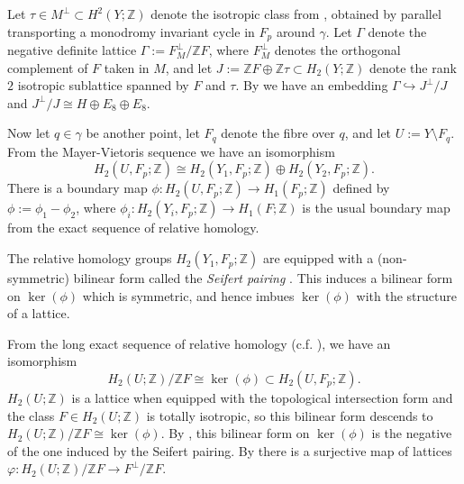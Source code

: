 \documentclass[a4paper]{amsart}
\theoremstyle{definition}
\theoremstyle{plain}
\theoremstyle{remark}
\newcommand{\bZ}{\mathbb{Z}}
\numberwithin{figure}{section}
\numberwithin{table}{section}
\begin{document}
Let $\tau \in M^{\perp} \subset H^2(Y;\bZ)$ denote the isotropic class from \cite[Definition 4.21]{dfk3slpms}, obtained by parallel transporting a monodromy invariant cycle in $F_p$ around $\gamma$. Let $\Gamma$ denote the negative definite lattice $\Gamma := F^{\perp}_{M}/\bZ F$, where $F^{\perp}_{M}$ denotes the orthogonal complement of $F$ taken in $M$, and let $J := \bZ F \oplus \bZ \tau \subset H_2(Y;\bZ)$ denote the rank $2$ isotropic sublattice spanned by $F$ and $\tau$. By \cite[Lemma 4.23]{dfk3slpms} we have an embedding $\Gamma \hookrightarrow J^{\perp}/J$ and $J^{\perp}/J \cong H \oplus E_8 \oplus E_8$.

Now let $q \in \gamma$ be another point, let $F_q$ denote the fibre over $q$, and let $U := Y \setminus F_q$. From the Mayer-Vietoris sequence we have an isomorphism
\begin{equation} \label{eq:homologysum} H_2(U,F_p;\bZ) \cong H_2(Y_1,F_p;\bZ) \oplus H_2(Y_2,F_p;\bZ).\end{equation}
There is a boundary map $\phi\colon H_2(U,F_p;\bZ) \to H_1(F_p;\bZ)$ defined by $\phi := \phi_1 - \phi_2$, where $\phi_i\colon H_2(Y_i,F_p;\bZ) \to H_1(F;\bZ)$ is the usual boundary map from the exact sequence of relative homology. 

The relative homology groups $H_2(Y_1,F_p;\bZ)$ are equipped with a (non-symmetric) bilinear form called the \emph{Seifert pairing} \cite[Definition 4.1]{dfk3slpms}. This induces a bilinear form on $\ker(\phi)$ which is symmetric, and hence imbues $\ker(\phi)$ with the structure of a lattice.

From the long exact sequence of relative homology (c.f. \cite[Lemma 4.13]{dfk3slpms}), we have an isomorphism
\[H_2(U;\bZ)/\bZ F \cong \ker(\phi) \subset H_2(U,F_p;\bZ).\]
$H_2(U;\bZ)$ is a lattice when equipped with the topological intersection form and the class $F \in H_2(U;\bZ)$ is totally isotropic, so this bilinear form descends to $H_2(U;\bZ)/\bZ F \cong \ker(\phi)$. By \cite[Proposition 4.18]{dfk3slpms}, this bilinear form on $\ker(\phi)$ is the negative of the one induced by the Seifert pairing. By \cite[Proposition 4.18]{dfk3slpms} there is a surjective map of lattices $\varphi\colon H_2(U;\bZ)/\bZ F  \to F^{\perp}/\bZ F$.
\end{document}
